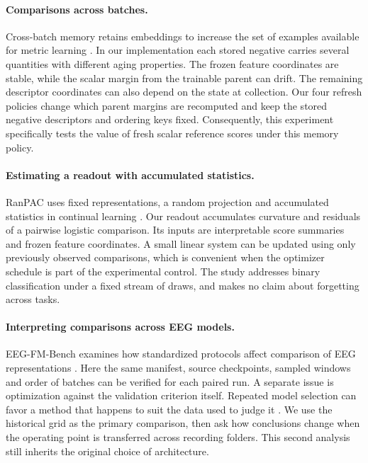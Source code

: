 \documentclass{article}
\begin{document}
\paragraph{Comparisons across batches.}
Cross-batch memory retains embeddings to increase the set of examples available for metric learning \citep{wang2020}. In our implementation each stored negative carries several quantities with different aging properties. The frozen feature coordinates are stable, while the scalar margin from the trainable parent can drift. The remaining descriptor coordinates can also depend on the state at collection. Our four refresh policies change which parent margins are recomputed and keep the stored negative descriptors and ordering keys fixed. Consequently, this experiment specifically tests the value of fresh scalar reference scores under this memory policy.

\paragraph{Estimating a readout with accumulated statistics.}
RanPAC uses fixed representations, a random projection and accumulated statistics in continual learning \citep{mcdonnell2023}. Our readout accumulates curvature and residuals of a pairwise logistic comparison. Its inputs are interpretable score summaries and frozen feature coordinates. A small linear system can be updated using only previously observed comparisons, which is convenient when the optimizer schedule is part of the experimental control. The study addresses binary classification under a fixed stream of draws, and makes no claim about forgetting across tasks.

\paragraph{Interpreting comparisons across EEG models.}
EEG-FM-Bench examines how standardized protocols affect comparison of EEG representations \citep{xiong2026}. Here the same manifest, source checkpoints, sampled windows and order of batches can be verified for each paired run. A separate issue is optimization against the validation criterion itself. Repeated model selection can favor a method that happens to suit the data used to judge it \citep{cawley2010}. We use the historical grid as the primary comparison, then ask how conclusions change when the operating point is transferred across recording folders. This second analysis still inherits the original choice of architecture.
\end{document}
